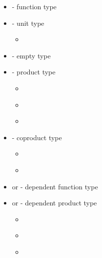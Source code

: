 \begin{itemize}
  \item{   - function type}
  \item{ - unit type}
  \begin{itemize}
    \item{ \AgdaSymbol{:} }
  \end{itemize}
  \item{ - empty type}
  \item{   - product type}
  \begin{itemize}
    \item{\AgdaInductiveConstructor{\_,\_} \AgdaSymbol{:}       }
    \item{ \AgdaSymbol{:}     }
    \item{ \AgdaSymbol{:}     }
  \end{itemize}
  \item{   - coproduct type}
  \begin{itemize}
    \item{ \AgdaSymbol{:}     }
    \item{ \AgdaSymbol{:}     }
  \end{itemize} 
  \item{  or \AgdaSymbol{(} \AgdaSymbol{:} \AgdaSymbol{)}   - dependent function type}
  \item{  or \AgdaFunction{Σ[}    \AgdaFunction{]}  - dependent product type}
  \begin{itemize}
    \item{\AgdaInductiveConstructor{\_,\_} \AgdaSymbol{:} \AgdaSymbol{(} \AgdaSymbol{:} \AgdaSymbol{)}     }
    \item{ \AgdaSymbol{:}    }
    \item{ \AgdaSymbol{:} \AgdaSymbol{(} \AgdaSymbol{:}  \AgdaSymbol{)}   \AgdaSymbol{(} \AgdaSymbol{)}}
  \end{itemize}
\end{itemize}

